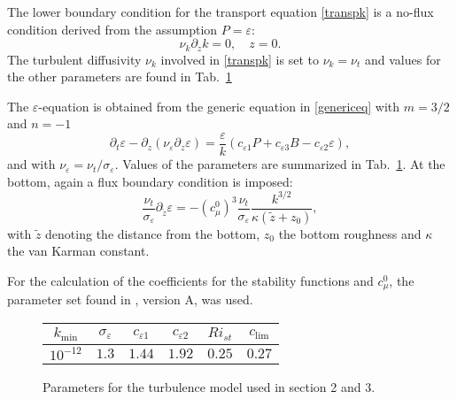 The lower boundary condition for 
the transport equation \eqref{transpk} is a no-flux condition derived from the 
assumption $P=\varepsilon$:
\begin{equation}
 \label{lowerBC}
 \nu_k \partial_z k = 0, \quad z=0.
\end{equation}
The turbulent diffusivity $\nu_k$ involved in \eqref{transpk} is set to $\nu_k 
= \nu_t$ and values for the other parameters are found in Tab.\ \ref{tabellchen}

The $\varepsilon$-equation is obtained from the generic equation in 
\eqref{genericeq} with $m=3\slash 2$ and $n=-1$ 
\begin{equation}
 \label{transpeps}
 \partial_t \varepsilon - \partial_z ( \nu_\varepsilon \partial_z \varepsilon) 
= \frac{\varepsilon}{k} (c_{\varepsilon 1}P + c_{\varepsilon 3} B 
-c_{\varepsilon 2} \varepsilon),
\end{equation}
and with $\nu_\varepsilon = \nu_t \slash \sigma_\varepsilon$. Values of the 
parameters are summarized in Tab.\ \ref{tabellchen}. At the bottom, again a 
flux boundary condition is imposed:
\begin{equation}
 \label{epsBC}
 \frac{\nu_t}{\sigma_\varepsilon} \partial_{\tilde{z}} \varepsilon = - 
(c_\mu^0)^3  \frac{\nu_t}{\sigma_\varepsilon} \frac{k^{3 \slash 2}}{\kappa 
(\tilde{z} +z_0)},
\end{equation}
with $\tilde{z}$ denoting the distance from the bottom, $z_0$ the bottom 
roughness and $\kappa$ the van Karman constant.

For the calculation of the coefficients for the stability functions and 
$c_\mu^0$, the parameter set found in \cite{Canuto2001}, version A, was used.

\begin{figure}[ht]
\begin{tabular}{cccccc}
  $k_{\min}$ & $\sigma_\varepsilon$ & $c_{\varepsilon 1}$ & 
$c_{\varepsilon 2}$ & $Ri_{st}$ & $c_{\lim}$\\
\hline
$10^{-12}$ & $1.3$ & $1.44$ & $1.92$ & $0.25$ & $0.27$ \\
 \end{tabular}
\caption{Parameters for the turbulence model used in section 
2 and 3.}\label{tabellchen}
\end{figure}